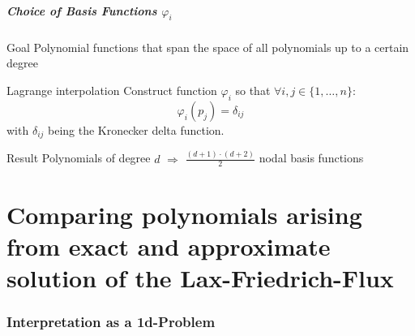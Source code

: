 \documentclass{beamer}
\renewcommand{\phi}{\varphi}
\begin{document}
\begin{frame}
  \frametitle{Choice of Basis Functions $\phi_i$}
  \begin{block}{Goal}
    Polynomial functions that span the space of all polynomials up to a certain degree
  \end{block}

  \begin{block}{Lagrange interpolation}
    Construct function $\phi_i$ so that 
    $\forall i,j \in \{1, \dots, n\}$:
    \begin{equation*}
      \phi_i(p_j) = \delta_{ij}
    \end{equation*}
    with $\delta_{ij}$ being the Kronecker delta function.
  \end{block}

  \begin{block}{Result}
    Polynomials of degree $d$ $\Rightarrow$
    $\frac{(d+1)\cdot(d+2)}{2}$ nodal basis functions
  \end{block}
\end{frame}

\part{Comparing polynomials arising from exact and approximate solution of the Lax-Friedrich-Flux}
\label{part:polynomialstuff}

\section{Interpretation as a 1d-Problem}
\label{sec:interpretation-as-1d-problem}

\newcommand{\twopoints}[3]{
  \draw[fill=#3] (#1,#2) circle (0.05);
  \draw[xshift=0.1cm,yshift=0.1cm,fill=#3] (#1,#2) circle (0.05);
}
\end{document}

